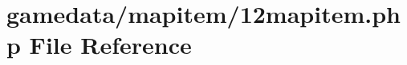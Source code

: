 \hypertarget{12mapitem_8php}{\section{gamedata/mapitem/12mapitem.php File Reference}
\label{12mapitem_8php}
}

